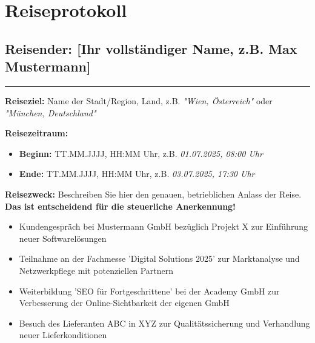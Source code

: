 \documentclass[10pt]{article}
\begin{document}
\section*{\centering Reiseprotokoll \FjCompanyName} %
\subsection*{\centering Reisender: [Ihr vollständiger Name, z.B. Max Mustermann]} %

\noindent\rule{\textwidth}{0.4pt} %

\vspace{10pt} %

\textbf{Reiseziel:}
Name der Stadt/Region, Land, z.B. \textit{"Wien, Österreich"} oder \textit{"München, Deutschland"}

\vspace{1em} %

\textbf{Reisezeitraum:}
\begin{itemize}[nosep, leftmargin=1.5em, itemsep=0.2em] %
    \item \textbf{Beginn:} TT.MM.JJJJ, HH:MM Uhr, z.B. \textit{01.07.2025, 08:00 Uhr}
    \item \textbf{Ende:} TT.MM.JJJJ, HH:MM Uhr, z.B. \textit{03.07.2025, 17:30 Uhr}
\end{itemize}

\vspace{1em}

\textbf{Reisezweck:}
Beschreiben Sie hier den genauen, betrieblichen Anlass der Reise. \textbf{Das ist entscheidend für die steuerliche Anerkennung!}
\begin{itemize}[nosep, leftmargin=1.5em, itemsep=0.2em]
    \item Kundengespräch bei Mustermann GmbH bezüglich Projekt X zur Einführung neuer Softwarelösungen
    \item Teilnahme an der Fachmesse 'Digital Solutions 2025' zur Marktanalyse und Netzwerkpflege mit potenziellen Partnern
    \item Weiterbildung 'SEO für Fortgeschrittene' bei der Academy GmbH zur Verbesserung der Online-Sichtbarkeit der eigenen GmbH
    \item Besuch des Lieferanten ABC in XYZ zur Qualitätssicherung und Verhandlung neuer Lieferkonditionen
\end{itemize}
\end{document}
